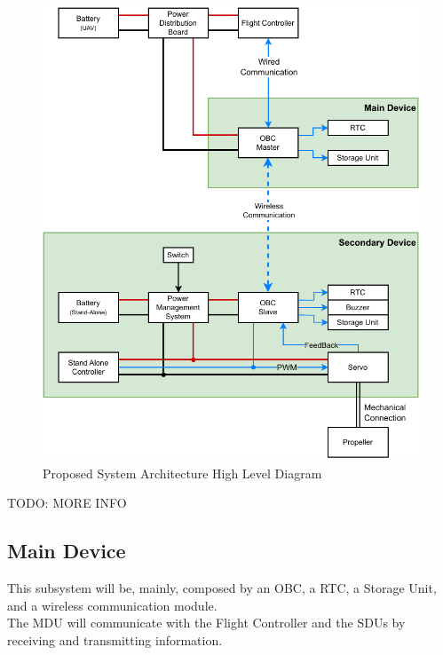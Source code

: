 \begin{figure}[H]
    \centering
    \includegraphics[scale=1]{ch3/assets/system_diagram.pdf}
    \caption{Proposed System Architecture High Level Diagram}
    \label{fig:system_diagram}
\end{figure}

TODO: MORE INFO

\subsection{Main Device}
This subsystem will be, mainly, composed by an \gls{OBC}, a \gls{RTC}, a Storage Unit, and a wireless communication module.\\
The MDU will communicate with the Flight Controller and the SDUs by receiving and transmitting information.

